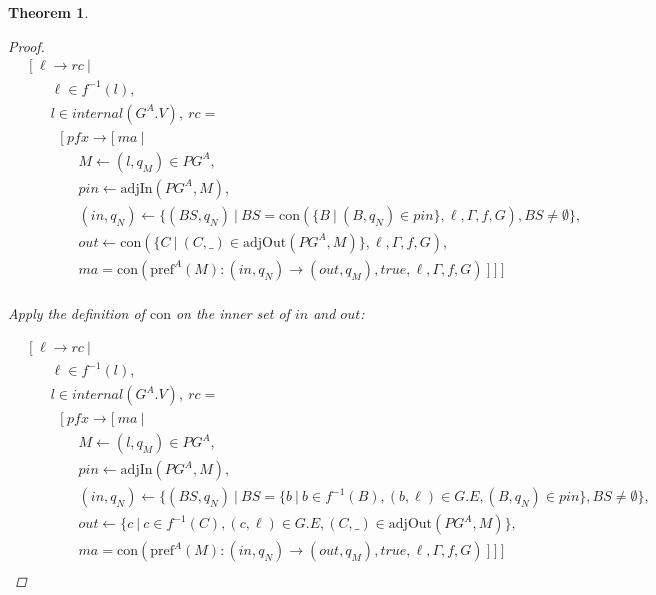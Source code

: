 \documentclass[twocolumn, openany]{sig-alternate-10pt}
\newcommand{\Con}{\mathrm{con}}
\newcommand{\Pref}{\ensuremath{\mathrm{pref}}}
\newtheorem{thm}{Theorem}
\begin{document}
\begin{thm}
\begin{proof}
    \[ \begin{array}{l}
     ~~~~~ [~ \ell \rightarrow rc ~\vert~ \\
     ~~~~~~~~~~~~ \ell \in f^{-1}(l), \\
     ~~~~~~~~~~~~ l \in internal(G^A.V), ~rc =  \\
     ~~~~~~~~~~~~~~~ [~ pfx \rightarrow [~ ma ~\vert~ \\
     ~~~~~~~~~~~~~~~~~~~~~ M \leftarrow (l,q_M) \in PG^A, \\
     ~~~~~~~~~~~~~~~~~~~~~ pin \leftarrow \text{adjIn}(PG^A,M), \\
     ~~~~~~~~~~~~~~~~~~~~~ (in,q_N) \leftarrow \{ (BS,q_N) ~\vert~ BS=\Con(\{B ~\vert~ (B,q_N) \in pin \}, \ell, \Gamma, f, G), BS \neq \emptyset \}, \\
     ~~~~~~~~~~~~~~~~~~~~~ out \leftarrow \Con(\{ C ~\vert~ (C,\_) \in \text{adjOut}(PG^A,M) \}, \ell,\Gamma,f,G), \\
     ~~~~~~~~~~~~~~~~~~~~~ ma = \Con(\Pref^A(M) : (in,q_N) \rightarrow (out,q_M), true, \ell, \Gamma, f, G) ~] ~] ~] \\
  \end{array} \]%

  Apply the definition of $\Con$ on the inner set of $in$ and $out$:

    \[ \begin{array}{l}
     ~~~~~ [~ \ell \rightarrow rc ~\vert~ \\
     ~~~~~~~~~~~~ \ell \in f^{-1}(l), \\
     ~~~~~~~~~~~~ l \in internal(G^A.V), ~rc =  \\
     ~~~~~~~~~~~~~~~ [~ pfx \rightarrow [~ ma ~\vert~ \\
     ~~~~~~~~~~~~~~~~~~~~~ M \leftarrow (l,q_M) \in PG^A, \\
     ~~~~~~~~~~~~~~~~~~~~~ pin \leftarrow \text{adjIn}(PG^A,M), \\
     ~~~~~~~~~~~~~~~~~~~~~ (in,q_N) \leftarrow \{ (BS,q_N) ~\vert~ BS=\{b ~\vert~ b \in f^{-1}(B), (b,\ell)\in G.E, (B,q_N) \in pin \}, BS \neq \emptyset \}, \\
     ~~~~~~~~~~~~~~~~~~~~~ out \leftarrow \{ c ~\vert~ c \in f^{-1}(C), (c,\ell)\in G.E, (C,\_) \in \text{adjOut}(PG^A,M) \}, \\
     ~~~~~~~~~~~~~~~~~~~~~ ma = \Con(\Pref^A(M) : (in,q_N) \rightarrow (out,q_M), true, \ell, \Gamma, f, G) ~] ~] ~] \\
  \end{array} \]%


\end{proof}
\end{thm}
\end{document}
